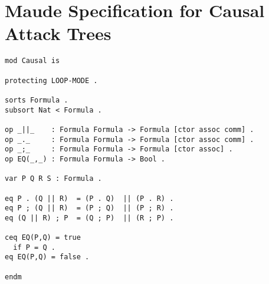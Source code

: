 \documentclass{llncs}
\begin{document}



\appendix

\section{Maude Specification for Causal Attack Trees}
\label{sec:maude-spec-causal-attack-trees}
\begin{verbatim}
mod Causal is

protecting LOOP-MODE .

sorts Formula .
subsort Nat < Formula .

op _||_    : Formula Formula -> Formula [ctor assoc comm] .
op _._     : Formula Formula -> Formula [ctor assoc comm] .
op _;_     : Formula Formula -> Formula [ctor assoc] .
op EQ(_,_) : Formula Formula -> Bool .

var P Q R S : Formula .

eq P . (Q || R)  = (P . Q)  || (P . R) .
eq P ; (Q || R)  = (P ; Q)  || (P ; R) .
eq (Q || R) ; P  = (Q ; P)  || (R ; P) .

ceq EQ(P,Q) = true
  if P = Q .
eq EQ(P,Q) = false .

endm  
\end{verbatim}
\end{document}
